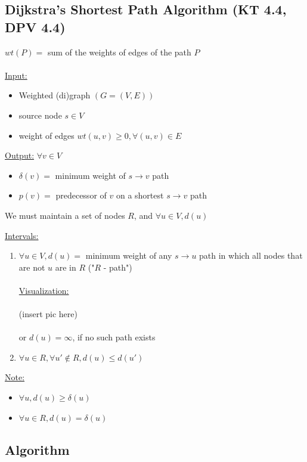 \documentclass[12pt]{article}
\begin{document}
\subsection{Dijkstra's Shortest Path Algorithm (KT 4.4, DPV 4.4)}

$wt(P) = $ sum of the weights of edges of the path $P$\\
\\
\underline{Input:} 
\begin{itemize}
	\item{Weighted (di)graph $(G=(V,E))$}
	\item{source node $s\in V$}
	\item{weight of edges $wt(u,v) \geq 0, \forall (u,v) \in E$}
\end{itemize}

\underline{Output:} $\forall v \in V$
\begin{itemize}
	\item{$\delta (v) = $ minimum weight of $s \rightarrow v$ path}
	\item{$p(v) = $ predecessor of $v$ on a shortest $s \rightarrow v$ path}
\end{itemize}

We must maintain a set of nodes $R$, and $\forall u\in V, d(u)$

\underline{Intervals:}
\begin{enumerate}
	\item{$\forall u\in V, d(u) = $ minimum weight of any $s \rightarrow u$ path in which all nodes that are not $u$ are in $R$ ("$R$ - path")\\
	\\
	\underline{Visualization:}\\
	\\
	(insert pic here)
	\\
	\\
	or $d(u) = \infty$, if no such path exists}
	\item{$\forall u \in R, \forall u' \not\in R, d(u) \leq d(u')$}
\end{enumerate}

\underline{Note:}
\begin{itemize}
	\item{$\forall u, d(u) \geq \delta (u)$}
	\item{$\forall u \in R, d(u) = \delta (u)$}
\end{itemize}

\subsection{Algorithm}
\end{document}
